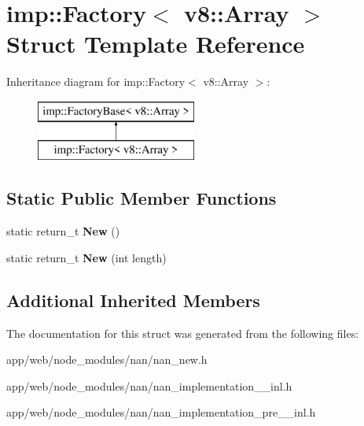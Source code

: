 \hypertarget{structimp_1_1_factory_3_01v8_1_1_array_01_4}{}\section{imp\+:\+:Factory$<$ v8\+:\+:Array $>$ Struct Template Reference}
\label{structimp_1_1_factory_3_01v8_1_1_array_01_4}
Inheritance diagram for imp\+:\+:Factory$<$ v8\+:\+:Array $>$\+:\begin{figure}[H]
\begin{center}
\leavevmode
\includegraphics[height=2.000000cm]{structimp_1_1_factory_3_01v8_1_1_array_01_4}
\end{center}
\end{figure}
\subsection*{Static Public Member Functions}
\begin{DoxyCompactItemize}
\item 
\mbox{\label{structimp_1_1_factory_3_01v8_1_1_array_01_4_ade4e8a07e290657e8ec3301f325c2d48}} 
static return\+\_\+t {\bfseries New} ()
\item 
\mbox{\label{structimp_1_1_factory_3_01v8_1_1_array_01_4_a93875e4344b6ffae446b0e6d600556d7}} 
static return\+\_\+t {\bfseries New} (int length)
\end{DoxyCompactItemize}
\subsection*{Additional Inherited Members}


The documentation for this struct was generated from the following files\+:\begin{DoxyCompactItemize}
\item 
app/web/node\+\_\+modules/nan/nan\+\_\+new.\+h\item 
app/web/node\+\_\+modules/nan/nan\+\_\+implementation\+\_\+\_\+inl.\+h\item 
app/web/node\+\_\+modules/nan/nan\+\_\+implementation\+\_\+pre\+\_\+\_\+inl.\+h\end{DoxyCompactItemize}
